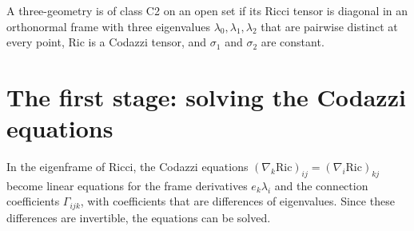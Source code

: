 \begin{definition}[Class C2]
A three-geometry is of class C2 on an open set if its Ricci tensor is diagonal in an orthonormal frame with three eigenvalues $\lambda_0,\lambda_1,\lambda_2$ that are pairwise distinct at every point, $\mathrm{Ric}$ is a Codazzi tensor, and $\sigma_1$ and $\sigma_2$ are constant.
\end{definition}

\section{The first stage: solving the Codazzi equations}

In the eigenframe of Ricci, the Codazzi equations $(\nabla_k\mathrm{Ric})_{ij}=(\nabla_i\mathrm{Ric})_{kj}$ become linear equations for the frame derivatives $e_k\lambda_i$ and the connection coefficients $\Gamma_{ijk}$, with coefficients that are differences of eigenvalues. Since these differences are invertible, the equations can be solved.

